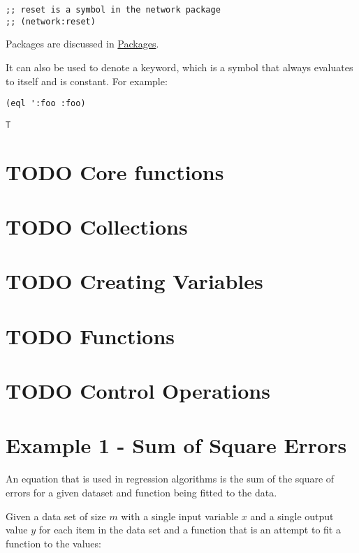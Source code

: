 \documentclass[11pt]{article}
\begin{document}
\begin{verbatim}
;; reset is a symbol in the network package
;; (network:reset)
\end{verbatim}

Packages are discussed in \hyperref[sec-13]{Packages}.

It can also be used to denote a keyword, which is a symbol that
always evaluates to itself and is constant. For example:

\begin{verbatim}
(eql ':foo :foo)
\end{verbatim}
\begin{verbatim}
T
\end{verbatim}

\section{{\bfseries\sffamily TODO} Core functions}
\label{sec-3}
\section{{\bfseries\sffamily TODO} Collections}
\label{sec-4}
\section{{\bfseries\sffamily TODO} Creating Variables}
\label{sec-5}
\section{{\bfseries\sffamily TODO} Functions}
\label{sec-6}
\section{{\bfseries\sffamily TODO} Control Operations}
\label{sec-7}

\section{Example 1 - Sum of Square Errors}
\label{sec-8}

An equation that is used in regression algorithms is the sum of
the square of errors for a given dataset and function being fitted
to the data.

Given a data set of size $m$ with a single input variable $x$ and a
single output value $y$ for each item in the data set
and a function that is an attempt to fit a function to the values:
\end{document}
